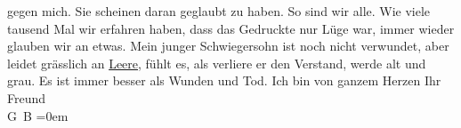 \begin{ledgroupsized}[t]{13cm}
               gegen mich.\pend
           \pstart
           Sie scheinen daran geglaubt zu haben. So sind wir alle. Wie viele tausend Mal wir
               erfahren haben, dass das Gedruckte {\pb}nur Lüge war, immer wieder glauben wir an etwas.\pend
           \pstart
           Mein junger Schwiegersohn ist
               noch nicht verwundet, aber leidet grässlich an \uline{Leere},
               fühlt es, als verliere er den Verstand, werde alt und grau. Es ist immer besser als
               Wunden und Tod.\pend
           \pstart
           Ich bin von ganzem Herzen Ihr Freund{\\[\baselineskip]}\spacefill\mbox{G B}\pend
           \leftskip=0em{}
         
         \endnumbering{}\end{ledgroupsized}  \newcommand{\dateiname}{L02223}\newcommand{\titel}{Georg Brandes an Arthur Schnitzler, 13. 12. 1915}\newcommand{\editorInnen}{Martin Anton Müller und Gerd-Hermann Susen}
      